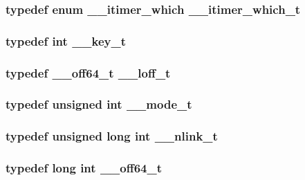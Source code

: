 \subsubsection[{\_\-\_\-itimer\_\-which\_\-t}]{\setlength{\rightskip}{0pt plus 5cm}typedef enum {\bf \_\-\_\-itimer\_\-which} {\bf \_\-\_\-itimer\_\-which\_\-t}}\label{tp_8c_a48f1fc9220364851ee8f8415ea4fdb76}
\subsubsection[{\_\-\_\-key\_\-t}]{\setlength{\rightskip}{0pt plus 5cm}typedef int {\bf \_\-\_\-key\_\-t}}\label{tp_8c_af3c7f24e5e2be86cb8aaf0642f1eba56}
\subsubsection[{\_\-\_\-loff\_\-t}]{\setlength{\rightskip}{0pt plus 5cm}typedef {\bf \_\-\_\-off64\_\-t} {\bf \_\-\_\-loff\_\-t}}\label{tp_8c_a13c06cb9050d1bccdf42e891814fb17a}
\subsubsection[{\_\-\_\-mode\_\-t}]{\setlength{\rightskip}{0pt plus 5cm}typedef unsigned int {\bf \_\-\_\-mode\_\-t}}\label{tp_8c_aaefffa18b83db785a1dd91dbf985d5f3}
\subsubsection[{\_\-\_\-nlink\_\-t}]{\setlength{\rightskip}{0pt plus 5cm}typedef unsigned long int {\bf \_\-\_\-nlink\_\-t}}\label{tp_8c_a4304786f6482ce97dd4a02c900fcf3b8}
\subsubsection[{\_\-\_\-off64\_\-t}]{\setlength{\rightskip}{0pt plus 5cm}typedef long int {\bf \_\-\_\-off64\_\-t}}\label{tp_8c_aca82290b875f93eb9451679fc04b0c9d}
